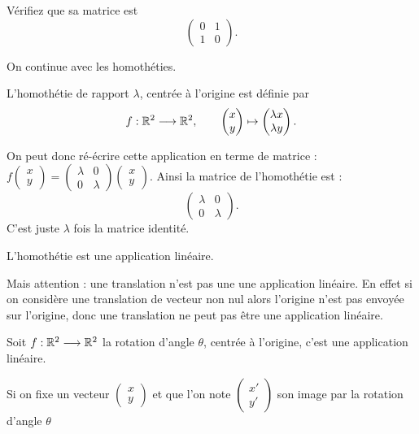 Vérifiez que sa matrice est 
\[\begin{pmatrix}0 & 1\\1 & 0\end{pmatrix}.\]

\diapo

On continue avec les homothéties.

L'homothétie de rapport $\lambda$, centrée à l'origine est définie par  
$$f: \mathbb{R}^2 \longrightarrow \mathbb{R}^2, \qquad 
\begin{pmatrix}x\\y\end{pmatrix} \mapsto \begin{pmatrix} \lambda x \\ \lambda y \end{pmatrix}.$$

On peut donc ré-écrire cette application en terme de matrice :
$f\left(\begin{smallmatrix} x \\ y \end{smallmatrix}\right) = 
\left(\begin{smallmatrix} \lambda & 0 \\ 0 & \lambda \end{smallmatrix}\right)
\left(\begin{smallmatrix} x \\ y \end{smallmatrix}\right)$.
Ainsi la matrice de l'homothétie est :
\[\begin{pmatrix} \lambda & 0 \\ 0 & \lambda \end{pmatrix}.\]
C'est juste $\lambda$ fois la matrice identité.

L'homothétie est une application linéaire.

Mais attention : une translation n'est pas une une application linéaire.
En effet si on considère une translation de vecteur non nul
alors l'origine n'est pas envoyée sur l'origine,
donc une translation ne peut pas être une application linéaire.

\diapo

Soit $f: \mathbb{R}^2 \longrightarrow \mathbb{R}^2$ la rotation d'angle $\theta$, centrée à l'origine,
c'est une application linéaire.



Si on fixe un vecteur $\left(\begin{smallmatrix}x \\ y \end{smallmatrix}\right)$ 
et que l'on note $\left(\begin{smallmatrix}x' \\ y' \end{smallmatrix}\right)$ 
son image par la rotation d'angle $\theta$

